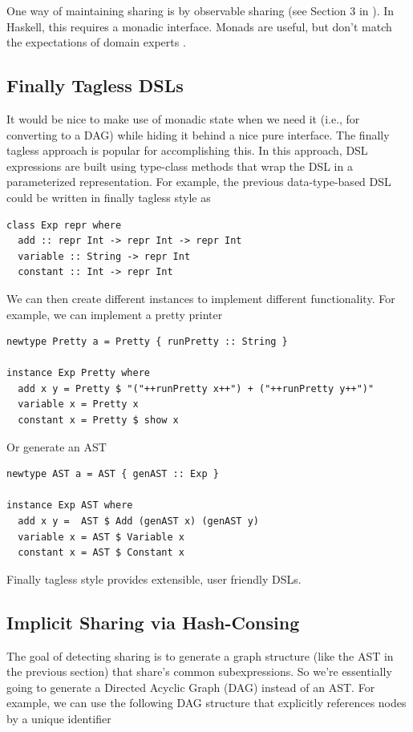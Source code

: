 \documentclass[runningheads]{llncs}
\begin{document}
One way of maintaining sharing is by observable sharing (see Section 3 in \cite{kiselyov:sharing}).
In Haskell, this requires a monadic interface.
Monads are useful, but don't match the expectations of domain experts \cite{odonnell:embedding}.

\subsection{Finally Tagless DSLs}

 It would be nice
to make use of monadic state when we need it (i.e., for converting to a DAG)
while hiding it behind a nice pure interface. The finally tagless approach
\cite{carette:finallytagless} is popular for accomplishing this. In this
approach, DSL expressions are built using type-class methods that wrap the DSL in
a parameterized representation. For example, the previous data-type-based DSL
could be written in finally tagless style as

\begin{verbatim}
class Exp repr where
  add :: repr Int -> repr Int -> repr Int
  variable :: String -> repr Int
  constant :: Int -> repr Int
\end{verbatim}

We can then create different instances to implement different functionality.
For example, we can implement a pretty printer
\begin{verbatim}
newtype Pretty a = Pretty { runPretty :: String }

instance Exp Pretty where
  add x y = Pretty $ "("++runPretty x++") + ("++runPretty y++")"
  variable x = Pretty x
  constant x = Pretty $ show x
\end{verbatim}

Or generate an AST
\begin{verbatim}
newtype AST a = AST { genAST :: Exp }

instance Exp AST where
  add x y =  AST $ Add (genAST x) (genAST y)
  variable x = AST $ Variable x
  constant x = AST $ Constant x
\end{verbatim}

Finally tagless style provides extensible, user friendly DSLs.

\subsection{Implicit Sharing via Hash-Consing}

The goal of detecting sharing is to generate a graph structure (like the AST in
the previous section) that share's common subexpressions. So we're essentially
going to generate a Directed Acyclic Graph (DAG) instead of an AST. For example,
we can use the following DAG structure that explicitly references nodes by a
unique identifier
\end{document}
